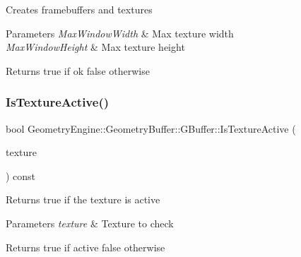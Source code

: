 Creates framebuffers and textures 
\begin{DoxyParams}{Parameters}
{\em Max\+Window\+Width} & Max texture width \\
\hline
{\em Max\+Window\+Height} & Max texture height \\
\hline
\end{DoxyParams}
\begin{DoxyReturn}{Returns}
true if ok false otherwise 
\end{DoxyReturn}
\mbox{\label{class_geometry_engine_1_1_geometry_buffer_1_1_g_buffer_a66ccde86e455532b2eac771163570f04}} 
\subsubsection{\texorpdfstring{IsTextureActive()}{IsTextureActive()}}
{\footnotesize\ttfamily bool Geometry\+Engine\+::\+Geometry\+Buffer\+::\+G\+Buffer\+::\+Is\+Texture\+Active (\begin{DoxyParamCaption}\item[{\mbox{\hyperlink{class_geometry_engine_1_1_geometry_buffer_1_1_g_buffer_a718dceafcac1915f7de061108597e1cc}{G\+B\+U\+F\+F\+E\+R\+\_\+\+T\+E\+X\+T\+U\+R\+E\+\_\+\+T\+Y\+PE}}}]{texture }\end{DoxyParamCaption}) const\hspace{0.3cm}{\ttfamily [inline]}}

Returns true if the texture is active 
\begin{DoxyParams}{Parameters}
{\em texture} & Texture to check \\
\hline
\end{DoxyParams}
\begin{DoxyReturn}{Returns}
true if active false otherwise 
\end{DoxyReturn}
\mbox{\label{class_geometry_engine_1_1_geometry_buffer_1_1_g_buffer_a487fb4fb346b34e5fa4a994e97211bab}} 
